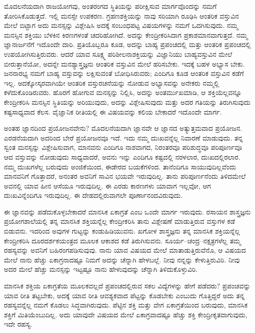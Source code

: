 ಮೊದಲನೆಯದಾಗಿ ರಾಜಯೋಗವು, ಅಂತರಂಗದ ಸ್ಥಿತಿಯನ್ನು ಪರೀಕ್ಷಿಸುವ ಮಾರ್ಗವೊಂದನ್ನು ನಮಗೆ ತೋರಿಸಿಕೊಡುತ್ತದೆ. ಇಲ್ಲಿ ಮನಸ್ಸೇ ಉಪಕರಣ. ಗ್ರಹಣಶಕ್ತಿಯನ್ನು ನಾವು ಸರಿಯಾಗಿ ರೂಢಿಸಿ ಆಂತರಿಕ ವಸ್ತುವಿನ ಮೇಲೆ ಬಿಟ್ಟಾಗ ಅದು ಮನಸ್ಸನ್ನು ವಿಶ್ಲೇಷಿಸಿ ಅದಕ್ಕೆ ಸಂಬಂಧಪಟ್ಟ ವಿಷಯಗಳನ್ನು ನಮಗೆ ಒದಗಿಸುವುದು. ನಮ್ಮ ಮನಸ್ಸಿನ ಶಕ್ತಿಯು ಬೆಳಕಿನ ಕಿರಣಗಳಂತೆ ಚದರಿಹೋಗಿದೆ. ಅದನ್ನು ಕೇಂದ್ರೀಕರಿಸಿದಾಗ ಪ್ರಕಾಶಮಾನವಾಗುತ್ತದೆ. ನಮ್ಮ ಜ್ಞಾನಾರ್ಜನೆಗೆ ಇದೊಂದೇ ದಾರಿ. ಪ್ರತಿಯೊಬ್ಬರೂ ಕೂಡ, ಅದನ್ನು ಬಾಹ್ಯ ಪ್ರಪಂಚದಲ್ಲಿ ಮತ್ತು ಆಂತರಿಕ ಪ್ರಪಂಚದಲ್ಲಿ ಉಪಯೋಗಿಸುತ್ತಿರುವರು. ಆದರೆ ಯಾವ ಸೂಕ್ಷ್ಮ ಪರಿಶೀಲನಾಶಕ್ತಿಯನ್ನು ವಿಜ್ಞಾನಿಯು ಬಾಹ್ಯವಸ್ತುವಿನ ಮೇಲೆ ಬೀರುತ್ತಾನೆಯೋ, ಅದನ್ನೇ ಮನಶ್ಯಾಸ್ತ್ರಜ್ಞನು ಆಂತರಿಕ ವಸ್ತುವಿನ ಮೇಲೆ ಹರಿಸಬೇಕು. ಇದಕ್ಕೆ ಬಹಳ ಅಭ್ಯಾಸ ಬೇಕು. ಜನನಾರಭ್ಯ ನಮಗೆ ಬಾಹ್ಯ ವಸ್ತುವನ್ನು ಲಕ್ಷಿಸುವಂತೆ ಬೋಧಿಸಿರುವರು; ಎಂದಿಗೂ ಕೂಡ ಆಂತರಿಕ ವಸ್ತುವಿನ ಕಡೆಗೆ ಇಲ್ಲ. ಅದಕ್ಕೋಸ್ಕರವಾಗಿಯೇ ಆಂತರಿಕ ವಸ್ತುರಚನೆಯನ್ನು ನೋಡುವ ಅಭ್ಯಾಸವನ್ನು ಅನೇಕರು ನಮ್ಮಲ್ಲಿ ಕಳೆದುಕೊಂಡಿರುವರು. ಹೊರಗೆ ಹೋಗುವ ಮನಸ್ಸನ್ನು ನಿಲ್ಲಿಸಿ, ಅದನ್ನು ಅಂತರ್ಮುಖಮಾಡಿ, ಆ ಶಕ್ತಿಯೆಲ್ಲವನ್ನೂ ಕೇಂದ್ರೀಕರಿಸಿ ಮನಸ್ಸಿನ ಸ್ಥಿತಿಯನ್ನು ಅರಿಯುವುದು, ಅದನ್ನು ವಿಶ್ಲೇಷಿಸುವುದು ಮತ್ತು ಅದರ ಗತಿಯನ್ನು ತಿರುಗಿಸುವುದು ಕಷ್ಟಸಾಧ್ಯವಾದ ಕೆಲಸ. ವೈಜ್ಞಾನಿಕ ರೀತಿಯಲ್ಲಿ ಈ ವಿಷಯವನ್ನು ಕಲಿಯ ಬೇಕಾದರೆ ಇದೊಂದೇ ಮಾರ್ಗ. 

\vskip 5pt

ಅಂತಹ ಜ್ಞಾನದಿಂದ ಪ್ರಯೋಜನವೇನು? ಮೊದಲನೆಯದಾಗಿ ಜ್ಞಾನವೇ ಆ ಜ್ಞಾನದ ಅತ್ಯುತ್ತಮವಾದ ಪ್ರಯೋಜನ. ಎರಡನೆಯದಾಗಿ ಅದರಿಂದ ಬೇರೆ ಪ್ರಯೋಜನವೂ ಇದೆ. ಇದು ನಮ್ಮ ದುಃಖವನ್ನೆಲ್ಲ ನಿವಾರಣೆ ಮಾಡುವುದು. ತನ್ನ ಸ್ವಂತ ಮನಸ್ಸನ್ನು ವಿಶ್ಲೇಷಿಸುವಾಗ, ಮಾನವನು ಎಂದಿಗೂ ನಾಶವಾಗದ, ನಿರಂತರವೂ ಪರಿಶುದ್ಧವೂ ಪರಿಪೂರ್ಣವೂ ಆದ ವಸ್ತುವನ್ನು ನೋಡುವುದು ಸಾಧ್ಯವಾದರೆ, ಅವನು ಇನ್ನು ಎಂದಿಗೂ ಕಷ್ಟದಲ್ಲಿ ನರಳಲಾರ, ದುಃಖದಲ್ಲಿರಲಾರ. ನಮ್ಮ ದುಃಖಗಳೆಲ್ಲ ಬರುವುದು ಅಂಜಿಕೆಯಿಂದ, ಈಡೇರದ ಬಯಕೆಗಳಿಂದ. ತಾನೆಂದಿಗೂ ಸಾಯುವುದಿಲ್ಲವೆಂದು ಮಾನವನಿಗೆ ಗೊತ್ತಾದರೆ, ಅನಂತರ ಅವನಿಗೆ ಸಾವಿನ ಭಯವೇ ಇರುವುದಿಲ್ಲ. ತಾನು ಪರಿಪೂರ್ಣನೆಂದು ತಿಳಿದಮೇಲೆ ಅವನಲ್ಲಿ ಯಾವ ಹೀನ ಆಸೆಯೂ ಇರುವುದಿಲ್ಲ. ಈ ಎರಡು ಕಾರಣಗಳು ಯಾವಾಗ ಇಲ್ಲವೋ, ಆಗ ದುಃಖವಿನ್ನೆಂದಿಗೂ ಇರುವುದಿಲ್ಲ. ಈ ದೇಹದಲ್ಲಿರುವಾಗಲೇ ಪೂರ್ಣಾನಂದವಿರುವುದು. 

ಈ ಜ್ಞಾನವನ್ನು ಪಡೆದುಕೊಳ್ಳಬೇಕಾದರೆ ಮಾನಸಿಕ ಏಕಾಗ್ರತೆ ಎಂಬ ಒಂದೇ ಮಾರ್ಗ ಇರುವುದು. ರಸಾಯನ ಶಾಸ್ತ್ರಜ್ಞನು ಪ್ರಯೋಗಶಾಲೆಯಲ್ಲಿ ತನ್ನ ಮಾನಸಿಕ ಶಕ್ತಿಯನ್ನೆಲ್ಲ ಕೇಂದ್ರೀಕರಿಸಿ ತಾನು ವಿಶ್ಲೇಷಣೆ ಮಾಡುತ್ತಿರುವ ವಸ್ತುಗಳ ಕಡೆ ಬಿಡುವನು. ಇದರಿಂದ ಅವುಗಳ ಗುಟ್ಟನ್ನು ಕಂಡುಹಿಡಿಯುವನು. ಖಗೋಳ ಶಾಸ್ತ್ರಜ್ಞನು ತನ್ನ ಮಾನಸಿಕ ಶಕ್ತಿಯನ್ನೆಲ್ಲ ಕೇಂದ್ರೀಕರಿಸಿ ದೂರದರ್ಶಕಯಂತ್ರದ ಮೂಲಕ ಆಕಾಶದ ಕಡೆ ತಿರುಗಿಸುವನು. ಸೂರ್ಯ–ಚಂದ್ರ–ನಕ್ಷತ್ರಗಳೆಲ್ಲ ತಮ್ಮ ರಹಸ್ಯವನ್ನು ಅವನಿಗೆ ಬಹಿರಂಗಪಡಿಸುವುವು. ನಾನು ಯಾವ ವಿಷಯದ ಮೇಲೆ ಮಾತಾಡುತ್ತಿರುವೆನೊ, ಆ ವಿಷಯದ ಮೇಲೆ ನಾನು ಹೆಚ್ಚು ಏಕಾಗ್ರನಾದಷ್ಟೂ ನಿಮಗೆ ಅದನ್ನು ಚೆನ್ನಾಗಿ ಹೇಳಬಲ್ಲೆ. ನೀವು ನನ್ನನ್ನು ಕೇಳುತ್ತಿರುವಿರಿ. ನೀವು ಅದರ ಮೇಲೆ ಹೆಚ್ಚು ಮನಸ್ಸನ್ನು ಇಟ್ಟಷ್ಟೂ ನಾನು ಹೇಳುವುದನ್ನು ಚೆನ್ನಾಗಿ ತಿಳಿದುಕೊಳ್ಳುವಿರಿ. 

ಮಾನಸಿಕ ಶಕ್ತಿಯ ಏಕಾಗ್ರತೆಯ ಮೂಲಕವಲ್ಲದೆ ಪ್ರಪಂಚದಲ್ಲಿರುವ ಸಕಲ ವಿದ್ಯೆಗಳನ್ನು ಹೇಗೆ ಪಡೆದರು? ಪ್ರಪಂಚವನ್ನು ಯಾವ ರೀತಿ ತಟ್ಟಬೇಕು, ಅದಕ್ಕೆ ಯಾವ ರೀತಿ ಆವಶ್ಯಕವಾದ ಪೆಟ್ಟನ್ನು ಕೊಡಬೇಕು ಎಂಬುದು ಗೊತ್ತಿದ್ದರೆ ಅದು ತನ್ನ ರಹಸ್ಯವನ್ನೆಲ್ಲ ನಮಗೆ ಕೊಡಲು ಸಿದ್ಧವಾಗಿರುವುದು. ಪೆಟ್ಟಿನ ಶಕ್ತಿ ಮತ್ತು ವೇಗ ಏಕಾಗ್ರತೆಯಿಂದ ಬರುವುದು, ಮಾನಸಿಕ ಶಕ್ತಿಗೆ ಮಿತಿಯೆಂಬುದಿಲ್ಲ. ಅದು ಯಾವುದೇ ವಿಷಯದ ಮೇಲೆ ಏಕಾಗ್ರವಾದಷ್ಟೂ ಹೆಚ್ಚು ಶಕ್ತಿ ಕೇಂದ್ರೀಕೃತವಾಗುವುದು, ಇದೇ ರಹಸ್ಯ. 

